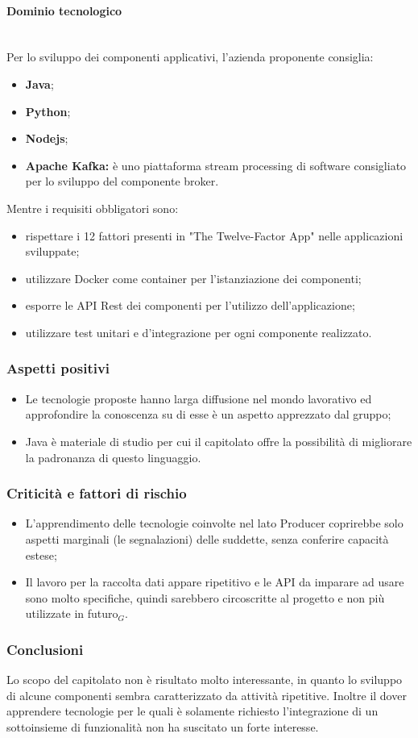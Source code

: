 \paragraph{Dominio tecnologico}\mbox{}\\
Per lo sviluppo dei componenti applicativi, l'azienda proponente consiglia:
\begin{itemize}
	\item \textbf{Java};
	\item \textbf{Python};
	\item \textbf{Nodejs};
	\item \textbf{Apache Kafka:} è uno piattaforma stream processing di software consigliato per lo sviluppo del componente broker.
\end{itemize}
Mentre i requisiti obbligatori sono:
\begin{itemize}
	\item rispettare i 12 fattori presenti in "The Twelve-Factor App" nelle applicazioni sviluppate;
	\item utilizzare Docker come container per l'istanziazione dei componenti;
	\item esporre le API Rest dei componenti per l'utilizzo dell'applicazione; 
	\item utilizzare test unitari e d'integrazione per ogni componente realizzato.
\end{itemize}
\subsubsection{Aspetti positivi}
\begin{itemize}
	\item Le tecnologie proposte hanno larga diffusione nel mondo lavorativo ed approfondire la conoscenza su di esse è un aspetto apprezzato dal gruppo;
	\item Java è materiale di studio per cui il capitolato offre la possibilità di migliorare la padronanza di questo linguaggio.
\end{itemize}
\subsubsection{Criticità e fattori di rischio}
\begin{itemize}
	\item L'apprendimento delle tecnologie coinvolte nel lato Producer coprirebbe solo aspetti marginali (le segnalazioni) delle suddette, senza conferire capacità estese;
	\item Il lavoro per la raccolta dati appare ripetitivo e le API da imparare ad usare sono molto specifiche, quindi sarebbero circoscritte al progetto e non più utilizzate in futuro$_{G}$. 
	
\end{itemize}
\subsubsection{Conclusioni}
Lo scopo del capitolato non è risultato molto interessante, in quanto lo sviluppo di alcune componenti sembra caratterizzato da attività ripetitive. Inoltre il dover apprendere tecnologie per le quali è solamente richiesto l'integrazione di un sottoinsieme di funzionalità non ha suscitato un forte interesse.